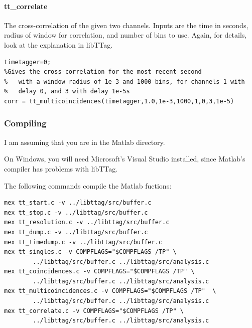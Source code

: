 \documentclass[10pt]{article}
\begin{document}
\paragraph{tt\_correlate}
The cross-correlation of the given two channels. Inputs are the time in seconds,
radius of window for correlation, and number of bins to use. Again, for details,
look at the explanation in libTTag.

\begin{verbatim}
timetagger=0;
%Gives the cross-correlation for the most recent second
%   with a window radius of 1e-3 and 1000 bins, for channels 1 with
%   delay 0, and 3 with delay 1e-5s
corr = tt_multicoincidences(timetagger,1.0,1e-3,1000,1,0,3,1e-5)

\end{verbatim}

\subsubsection{Compiling}
I am assuming that you are in the Matlab directory.

On Windows, you will need Microsoft's Visual Studio installed, since Matlab's compiler has problems with libTTag.

The following commands compile the Matlab fuctions:

\begin{verbatim}
mex tt_start.c -v ../libttag/src/buffer.c
mex tt_stop.c -v ../libttag/src/buffer.c
mex tt_resolution.c -v ../libttag/src/buffer.c
mex tt_dump.c -v ../libttag/src/buffer.c
mex tt_timedump.c -v ../libttag/src/buffer.c
mex tt_singles.c -v COMPFLAGS="$COMPFLAGS /TP" \
        ../libttag/src/buffer.c ../libttag/src/analysis.c
mex tt_coincidences.c -v COMPFLAGS="$COMPFLAGS /TP" \
        ../libttag/src/buffer.c ../libttag/src/analysis.c
mex tt_multicoincidences.c -v COMPFLAGS="$COMPFLAGS /TP"  \
        ../libttag/src/buffer.c ../libttag/src/analysis.c
mex tt_correlate.c -v COMPFLAGS="$COMPFLAGS /TP" \
        ../libttag/src/buffer.c ../libttag/src/analysis.c
\end{verbatim}
\end{document}
